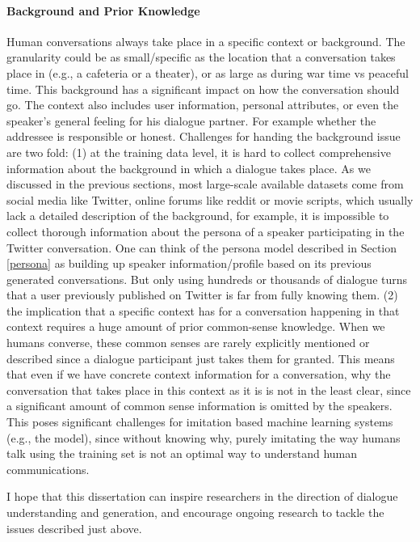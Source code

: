  \paragraph{Background and Prior Knowledge}
 Human conversations always take place in a specific context or background. The granularity could be as small/specific as the location that a conversation takes place in (e.g., a cafeteria or a theater), or as large as during  war time vs peaceful time. 
 This background has
   a significant impact on how the conversation should go. 
 The context also includes user information, personal attributes, or even the speaker's general feeling for his dialogue partner. For example whether the addressee is responsible or honest. 
 Challenges for handing the background issue are two fold: (1) at the training data level, it is hard to collect comprehensive information about the background in which a dialogue takes place. As we discussed in the previous sections, most large-scale available datasets  come from social media like Twitter, online forums like reddit or movie scripts, which usually lack a detailed description of 
 the background, for example, it is impossible to collect thorough information about the persona of a speaker participating in the Twitter conversation. 
 One can think of the persona model described in Section \ref{persona} as building up speaker information/profile based on its previous generated conversations. 
 But only using hundreds or thousands of dialogue turns that a user previously published on Twitter is far from fully knowing them. 
  (2) the implication that a specific context has for a conversation happening in that context requires a huge amount of prior common-sense knowledge. When we humans converse, these common senses are rarely explicitly mentioned or described since a dialogue participant just takes them for granted. This means that even if we have concrete context information for a conversation, 
 why the conversation that takes place in this  context as it is is not in the least clear, since a significant amount of common sense information is omitted by the speakers.
 This poses significant challenges for imitation based machine learning systems (e.g., the \sts model), since without knowing why, purely imitating the way humans talk using the training set is not an optimal way to understand human communications. 
 
I hope that this dissertation can inspire researchers in the direction of dialogue understanding and generation, and encourage ongoing research to 
tackle the issues described just above. 
